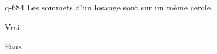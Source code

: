 \begin{truefalse}{q-684}
Les sommets d'un losange sont sur un même cercle.
\item Vrai
\item* Faux
\end{truefalse}

